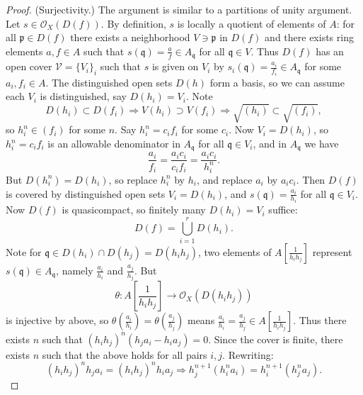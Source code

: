 \documentclass[12pt]{article}
\begin{document}
\begin{proof}
	(Surjectivity.) The argument is similar to a partitions of unity argument. Let $s\in\mathcal{O}_X(D(f))$. By definition, $s$ is locally a quotient of elements of $A$: for all $\mathfrak{p}\in D(f)$ there exists a neighborhood $V\ni\mathfrak{p}$ in $D(f)$ and there exists ring elements $a,f\in A$ such that $s(\mathfrak{q})=\frac{a}{f}\in A_\mathfrak{q}$ for all $\mathfrak{q}\in V$. Thus $D(f)$ has an open cover $\mathcal{V}=\{V_i\}_i$ such that $s$ is given on $V_i$ by $s_i(\mathfrak{q})=\frac{a_i}{f_i}\in A_\mathfrak{q}$ for some $a_i,f_i\in A$. The distinguished open sets $D(h)$ form a basis, so we can assume each $V_i$ is distinguished, say $D(h_i)=V_i$. Note 
	\begin{equation*}
		D(h_i)\subset D(f_i) \Rightarrow V(h_i)\supset V(f_i) \Rightarrow \sqrt{(h_i)}\subset\sqrt{(f_i)},
	\end{equation*}
	so $h_i^n\in (f_i)$ for some $n$. Say $h_i^n=c_if_i$ for some $c_i$. Now $V_i=D(h_i)$, so $h_i^n=c_if_i$ is an allowable denominator in $A_\mathfrak{q}$ for all $\mathfrak{q}\in V_i$, and in $A_\mathfrak{q}$ we have 
	\begin{equation*}
		\frac{a_i}{f_i} = \frac{a_ic_i}{c_if_i} = \frac{a_ic_i}{h_i^n}.
	\end{equation*}
	But $D(h_i^n)=D(h_i)$, so replace $h_i^n$ by $h_i$, and replace $a_i$ by $a_ic_i$. Then $D(f)$ is covered by distinguished open sets $V_i=D(h_i)$, and $s(\mathfrak{q})=\frac{a_i}{h_i}$ for all $\mathfrak{q}\in V_i$. Now $D(f)$ is quasicompact, so finitely many $D(h_i)=V_i$ suffice:
	\begin{equation*}
		D(f) = \bigcup_{i=1}^r D(h_i).
	\end{equation*}
	Note for $\mathfrak{q}\in D(h_i)\cap D(h_j)=D(h_ih_j)$, two elements of $A[\frac{1}{h_ih_j}]$ represent $s(\mathfrak{q})\in A_\mathfrak{q}$, namely $\frac{a_i}{h_i}$ and $\frac{a_j}{h_j}$. But 
	\begin{equation*}
		\theta: A[\frac{1}{h_ih_j}]\to \mathcal{O}_X(D(h_ih_j))
	\end{equation*}
	is injective by above, so $\theta(\frac{a_i}{h_i})=\theta(\frac{a_j}{h_j})$ means $\frac{a_i}{h_i}=\frac{a_j}{h_j}\in A[\frac{1}{h_ih_j}]$. Thus there exists $n$ such that $(h_ih_j)^n(h_ja_i-h_ia_j)=0$. Since the cover is finite, there exists $n$ such that the above holds for all pairs $i,j$. Rewriting:
	\begin{equation*}
		(h_ih_j)^nh_ja_i=(h_ih_j)^nh_ia_j \Rightarrow h_j^{n+1}(h_i^na_i)=h_i^{n+1}(h_j^na_j).
	\end{equation*}

\end{proof}
\end{document}
